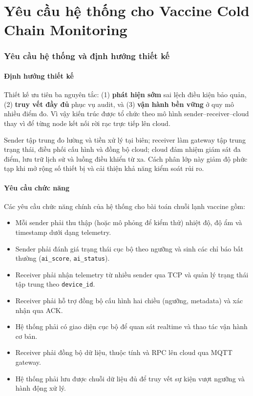 \documentclass[12pt,a4paper]{report}
\begin{document}
\part{Yêu cầu hệ thống cho Vaccine Cold Chain Monitoring}

\section{Yêu cầu hệ thống và định hướng thiết kế}

\subsection{Định hướng thiết kế}
Thiết kế ưu tiên ba nguyên tắc: (1) \textbf{phát hiện sớm} sai lệch điều kiện bảo quản, (2) \textbf{truy vết đầy đủ} phục vụ audit, và (3) \textbf{vận hành bền vững} ở quy mô nhiều điểm đo. Vì vậy kiến trúc được tổ chức theo mô hình sender--receiver--cloud thay vì để từng node kết nối rời rạc trực tiếp lên cloud.

Sender tập trung đo lường và tiền xử lý tại biên; receiver làm gateway tập trung trạng thái, điều phối cấu hình và đồng bộ cloud; cloud đảm nhiệm giám sát đa điểm, lưu trữ lịch sử và luồng điều khiển từ xa. Cách phân lớp này giảm độ phức tạp khi mở rộng số thiết bị và cải thiện khả năng kiểm soát rủi ro.

\subsection{Yêu cầu chức năng}
Các yêu cầu chức năng chính của hệ thống cho bài toán chuỗi lạnh vaccine gồm:
\begin{itemize}[leftmargin=1.5em]
    \item Mỗi sender phải thu thập (hoặc mô phỏng để kiểm thử) nhiệt độ, độ ẩm và timestamp dưới dạng telemetry.
    \item Sender phải đánh giá trạng thái cục bộ theo ngưỡng và sinh các chỉ báo bất thường (\texttt{ai\_score}, \texttt{ai\_status}).
    \item Receiver phải nhận telemetry từ nhiều sender qua TCP và quản lý trạng thái tập trung theo \texttt{device\_id}.
    \item Receiver phải hỗ trợ đồng bộ cấu hình hai chiều (ngưỡng, metadata) và xác nhận qua ACK.
    \item Hệ thống phải có giao diện cục bộ để quan sát realtime và thao tác vận hành cơ bản.
    \item Receiver phải đồng bộ dữ liệu, thuộc tính và RPC lên cloud qua MQTT gateway.
    \item Hệ thống phải lưu được chuỗi dữ liệu đủ để truy vết sự kiện vượt ngưỡng và hành động xử lý.
\end{itemize}
\end{document}
